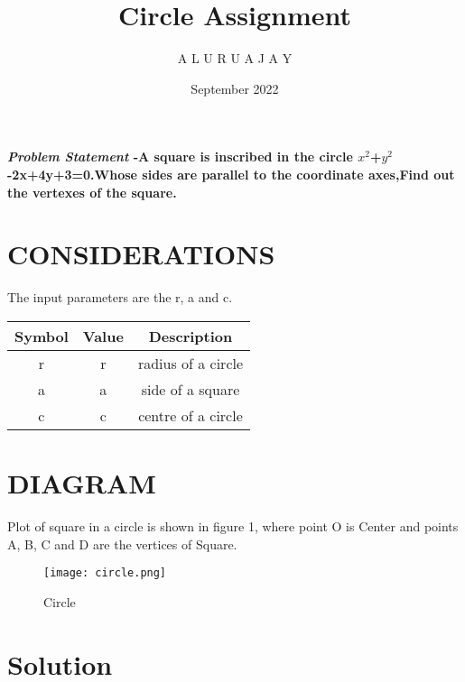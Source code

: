 \documentclass[journal,10pt,twocolumn]{article}
\title{\textbf{Circle Assignment}}
\author{A L U R U A J A Y}
\date{September 2022}
\begin{document}
\maketitle
\paragraph{\textit{Problem Statement} -A square is inscribed in the circle $x^2$+$y^2$-2x+4y+3=0.Whose sides are parallel to the coordinate axes,Find out the vertexes of the square.}

\section{CONSIDERATIONS}
\vspace{0.2cm}
The input parameters are the r, a and c. \\
\vspace{0.2cm}
{

\setlength\extrarowheight{2pt}
\begin{tabular}{|c|c|c|}
	\hline
	\textbf{Symbol}&\textbf{Value}&\textbf{Description}\\
	\hline
	r&r& radius of a circle\\
	\hline
	a&a&side of a square\\
	\hline
	c&c&centre of a circle\\
	\hline
\end{tabular}
}
\section{DIAGRAM}
Plot of square in a circle is shown in figure 1, where point O is Center and points A, B, C and D are the vertices of Square.
\begin{figure}[h]
\texttt{[image: circle.png]}
\caption{Circle}
\label{fig:Circle}
\end{figure}

\section{Solution}

\vspace{0.25cm}
\end{document}
